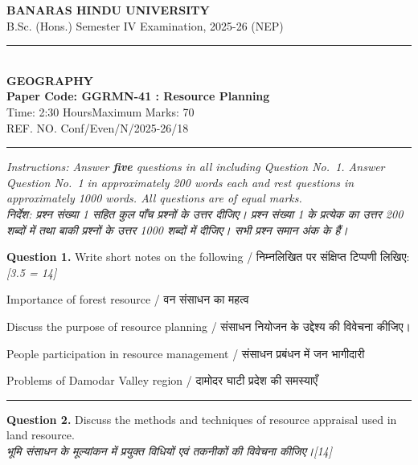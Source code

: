 \documentclass[11pt,a4paper]{article}
\newcommand{\pts}[1]{\hfill   \textit{[#1]}}
\begin{document}
\begin{center}
  {\large\bfseries BANARAS HINDU UNIVERSITY}\\[2pt]
  {\normalsize B.Sc. (Hons.) Semester IV Examination, 2025-26 (NEP)}\\[6pt]
  \rule{0.8\linewidth}{0.5pt}\\[6pt]
  {\large\bfseries GEOGRAPHY}\\[4pt]
  {\large\bfseries Paper Code: GGRMN-41 : Resource Planning}\\[4pt]
  {\normalsize Time: 2:30 Hours\hfill Maximum Marks: 70}\\[2pt]
  {\small REF. NO. Conf/Even/N/2025-26/18}
\end{center}

\rule{\linewidth}{0.4pt}

\smallskip



\noindent   \textit{Instructions: Answer   \textbf{five} questions in all including Question No.~1. Answer Question No.~1 in approximately 200 words each and rest questions in approximately 1000 words. All questions are of equal marks.}\\[4pt]



\noindent   \textit{निर्देश: प्रश्न संख्या 1 सहित कुल पाँच प्रश्नों के उत्तर दीजिए। प्रश्न संख्या 1 के प्रत्येक का उत्तर 200 शब्दों में तथा बाकी प्रश्नों के उत्तर 1000 शब्दों में दीजिए। सभी प्रश्न समान अंक के हैं।}

\bigskip




\noindent   \textbf{Question 1.} Write short notes on the following / निम्नलिखित पर संक्षिप्त टिप्पणी लिखिए:\pts{3.5   = 14}

\begin{parts}
  \item Importance of forest resource / वन संसाधन का महत्व
  \item Discuss the purpose of resource planning / संसाधन नियोजन के उद्देश्य की विवेचना कीजिए।
  \item People participation in resource management / संसाधन प्रबंधन में जन भागीदारी
  \item Problems of Damodar Valley region / दामोदर घाटी प्रदेश की समस्याएँ
\end{parts}

\medskip\rule{\linewidth}{0.2pt}\medskip




\noindent   \textbf{Question 2.} Discuss the methods and techniques of resource appraisal used in land resource.\\
   \textit{भूमि संसाधन के मूल्यांकन में प्रयुक्त विधियों एवं तकनीकों की विवेचना कीजिए।}\pts{14}
\end{document}
